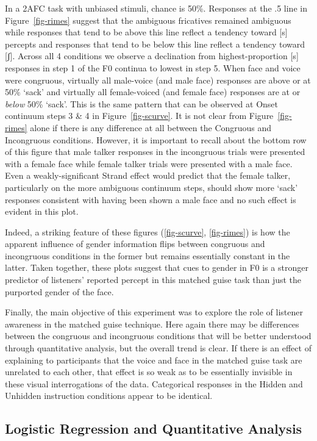 \documentclass[
  letterpaper,
  DIV=11,
  numbers=noendperiod]{scrartcl}
\begin{document}
In a 2AFC task with unbiased stimuli, chance is 50\%. Responses at the
.5 line in Figure~\ref{fig-rimes} suggest that the ambiguous fricatives
remained ambiguous while responses that tend to be above this line
reflect a tendency toward {[}s{]} percepts and responses that tend to be
below this line reflect a tendency toward {[}ʃ{]}. Across all 4
conditions we observe a declination from highest-proportion {[}s{]}
responses in step 1 of the F0 continua to lowest in step 5. When face
and voice were congruous, virtually all male-voice (and male face)
responses are above or at 50\% `sack' and virtually all female-voiced
(and female face) responses are at or \emph{below} 50\% `sack'. This is
the same pattern that can be observed at Onset continuum steps 3 \& 4 in
Figure~\ref{fig-scurve}. It is not clear from Figure~\ref{fig-rimes}
alone if there is any difference at all between the Congruous and
Incongruous conditions. However, it is important to recall about the
bottom row of this figure that male talker responses in the incongruous
trials were presented with a female face while female talker trials were
presented with a male face. Even a weakly-significant Strand effect
would predict that the female talker, particularly on the more ambiguous
continuum steps, should show more `sack' responses consistent with
having been shown a male face and no such effect is evident in this
plot.

Indeed, a striking feature of these figures
(\ref{fig-scurve}, \ref{fig-rimes}) is how the apparent influence of
gender information flips between congruous and incongruous conditions in
the former but remains essentially constant in the latter. Taken
together, these plots suggest that cues to gender in F0 is a stronger
predictor of listeners' reported percept in this matched guise task than
just the purported gender of the face.

Finally, the main objective of this experiment was to explore the role
of listener awareness in the matched guise technique. Here again there
may be differences between the congruous and incongruous conditions that
will be better understood through quantitative analysis, but the overall
trend is clear. If there is an effect of explaining to participants that
the voice and face in the matched guise task are unrelated to each
other, that effect is so weak as to be essentially invisible in these
visual interrogations of the data. Categorical responses in the Hidden
and Unhidden instruction conditions appear to be identical.

\subsection{Logistic Regression and Quantitative
Analysis}\label{logistic-regression-and-quantitative-analysis}
\end{document}
